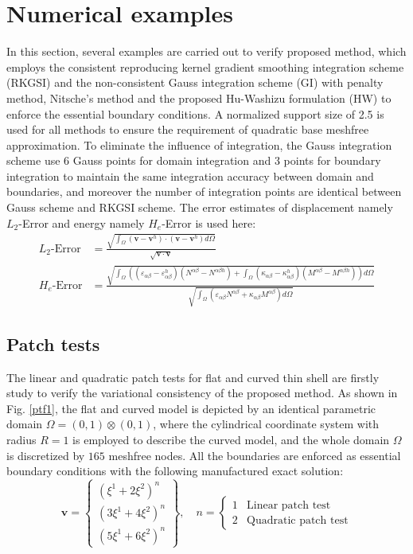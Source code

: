 
\section{Numerical examples}\label{examples}
In this section, several examples are carried out to verify proposed method, which employs the consistent reproducing kernel gradient smoothing integration scheme (RKGSI) and the non-consistent Gauss integration scheme (GI) with penalty method, Nitsche's method and the proposed Hu-Washizu formulation (HW) to enforce the essential boundary conditions. A normalized support size of 2.5 is used for all methods to ensure the requirement of quadratic base meshfree approximation. To eliminate the influence of integration, the Gauss integration scheme use 6 Gauss points for domain integration and 3 points for boundary integration to maintain the same integration accuracy between domain and boundaries, and moreover the number of integration points are identical between Gauss scheme and RKGSI scheme. The error estimates of displacement namely $L_2$-Error and energy namely $H_e$-Error is used here:
\begin{equation}
\begin{split}
L_2\text{-Error} &= \frac{\sqrt{\int_\Omega(\boldsymbol v - \boldsymbol v^h) \cdot (\boldsymbol v - \boldsymbol v^h)d\Omega}}{\sqrt{\boldsymbol v \cdot \boldsymbol v}} \\
H_e\text{-Error} &= \frac{\sqrt{\int_\Omega \left ((\varepsilon_{\alpha\beta} - \varepsilon_{\alpha\beta}^h)(N^{\alpha\beta} - N^{\alpha\beta h}) + \int_\Omega(\kappa_{\alpha\beta}-\kappa_{\alpha\beta}^h)(M^{\alpha\beta}-M^{\alpha\beta h}) \right )d\Omega}}{\sqrt{\int_\Omega(\varepsilon_{\alpha\beta}N^{\alpha\beta} + \kappa_{\alpha\beta}M^{\alpha\beta})d\Omega}}
\end{split}
\end{equation}

\subsection{Patch tests}
The linear and quadratic patch tests for flat and curved thin shell are firstly study to verify the variational consistency of the proposed method. As shown in Fig. \ref{ptf1}, the flat and curved model is depicted by an identical parametric domain $\Omega = (0,1)\otimes(0,1)$, where the cylindrical coordinate system with radius $R=1$ is employed to describe the curved model, and the whole domain $\Omega$ is discretized by $165$ meshfree nodes. All the boundaries are enforced as essential boundary conditions with the following manufactured exact solution:
\begin{equation}
\boldsymbol v = \begin{Bmatrix}
(\xi^1+2\xi^2)^n \\ (3\xi^1+4\xi^2)^n \\ (5\xi^1+6\xi^2)^n
\end{Bmatrix},\quad
n = \begin{cases}
1 & \text{Linear patch test} \\
2 & \text{Quadratic patch test}
\end{cases}
\end{equation}

